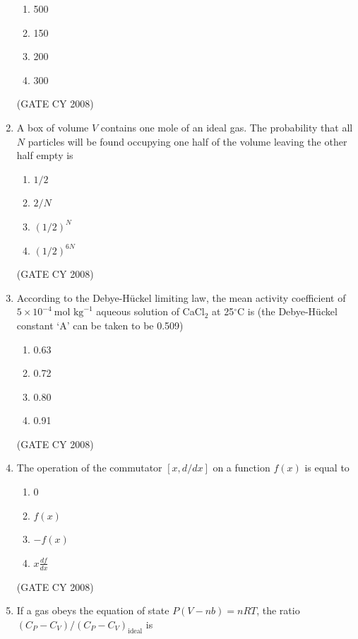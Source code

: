\documentclass[12pt]{article}
\begin{document}
\begin{enumerate}
\begin{enumerate}
\item 500
\item 150
\item 200
\item 300
\end{enumerate}    \hfill{(GATE CY 2008)}




\item A box of volume $V$ contains one mole of an ideal gas. The probability that all $N$ particles will be found occupying one half of the volume leaving the other half empty is

\begin{enumerate}
\item $1/2$
\item $2/N$
\item $(1/2)^N$
\item $(1/2)^{6N}$
\end{enumerate}    \hfill{(GATE CY 2008)}




\item According to the Debye-Hückel limiting law, the mean activity coefficient of $5 \times 10^{-4}~\text{mol kg}^{-1}$ aqueous solution of CaCl$_2$ at 25$^\circ$C is (the Debye-Hückel constant ‘A’ can be taken to be 0.509)

\begin{enumerate}
\item 0.63
\item 0.72
\item 0.80
\item 0.91
\end{enumerate}    \hfill{(GATE CY 2008)}




\item The operation of the commutator $[x, d/dx]$ on a function $f(x)$ is equal to

\begin{enumerate}
\item 0
\item $f(x)$
\item $-f(x)$
\item $x \frac{df}{dx}$
\end{enumerate}    \hfill{(GATE CY 2008)}




\item If a gas obeys the equation of state $P (V - nb) = nRT$, the ratio $(C_P - C_V)/(C_P - C_V)_{\text{ideal}}$ is


\end{enumerate}
\end{document}
